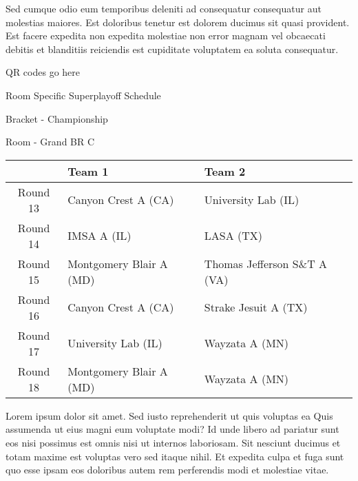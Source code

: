 \documentclass{article}%
\begin{document}
\newline%
Sed cumque odio eum temporibus deleniti ad consequatur consequatur aut molestias maiores. Est doloribus tenetur est dolorem ducimus sit quasi provident. Est facere expedita non expedita molestiae non error magnam vel obcaecati debitis et blanditiis reiciendis est cupiditate voluptatem ea soluta consequatur.%
\vspace*{140pt}%
\begin{center}%
\begin{Huge}%
QR codes go here%
\end{Huge}%
\end{center}%
\newpage%
\begin{center}%
\begin{Huge}%
Room Specific Superplayoff Schedule%
\end{Huge}%
\vspace*{8pt}%
\linebreak%
\begin{Large}%
Bracket {-} Championship%
\end{Large}%
\vspace*{8pt}%
\linebreak%
\vspace*{8pt}%
\begin{Large}%
Room {-} Grand BR C%
\end{Large}%
\end{center}%
%
\begin{tabularx}{\textwidth}{|c|Y|Y|}%
\hline%
&Team 1&Team 2\\%
\hline%
Round 13&Canyon Crest A (CA)&University Lab (IL)\\%
Round 14&IMSA A (IL)&LASA (TX)\\%
Round 15&Montgomery Blair A (MD)&Thomas Jefferson S\&T A (VA)\\%
Round 16&Canyon Crest A (CA)&Strake Jesuit A (TX)\\%
Round 17&University Lab (IL)&Wayzata A (MN)\\%
Round 18&Montgomery Blair A (MD)&Wayzata A (MN)\\%
\hline%
\end{tabularx}%
\vspace*{8pt}%
\newline%
Lorem ipsum dolor sit amet. Sed iusto reprehenderit ut quis voluptas ea Quis assumenda ut eius magni eum voluptate modi? Id unde libero ad pariatur sunt eos nisi possimus est omnis nisi ut internos laboriosam. Sit nesciunt ducimus et totam maxime est voluptas vero sed itaque nihil. Et expedita culpa et fuga sunt quo esse ipsam eos doloribus autem rem perferendis modi et molestiae vitae.\newline%
\end{document}
